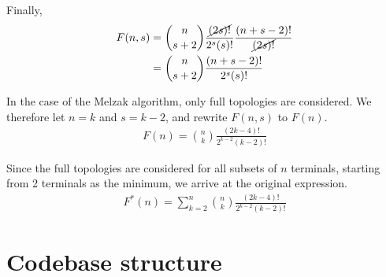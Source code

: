 \documentclass{l4proj}
\begin{document}
\begin{appendices}
    Finally,
    \begin{equation*}
        \begin{aligned}
            F(n, s) & = \binom{n}{s+2}\frac{\cancel{(2s)!}}{2^s(s)!}\frac{(n + s - 2)!}{\cancel{(2s)!}} \\
                    & = \binom{n}{s+2}\frac{(n + s - 2)!}{2^s(s)!}
        \end{aligned}
    \end{equation*}

    In the case of the Melzak algorithm, only full topologies are considered. We therefore let $n = k$ and $s = k - 2$, and rewrite $F(n, s)$ to $F(n)$.
    \begin{equation*}
        \begin{aligned}
            F(n) = \binom{n}{k}\frac{(2k - 4)!}{2^{k-2}(k-2)!}
        \end{aligned}
    \end{equation*}

    Since the full topologies are considered for all subsets of $n$ terminals, starting from 2 terminals as the minimum, we arrive at the original expression.
    \begin{equation*}
        \begin{aligned}
            F^*(n) = \sum_{k=2}^{n} \binom{n}{k}\frac{(2k - 4)!}{2^{k-2}(k-2)!}
        \end{aligned}
    \end{equation*}

    \chapter{Codebase structure}
    \label{app:repository_structure}
    



\end{appendices}




\renewcommand{\thechapter}{0}

\end{document}
